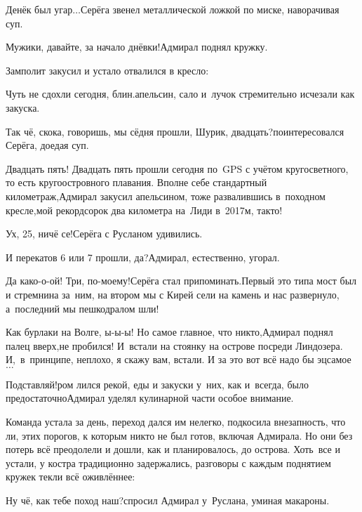 \diagdash Денёк был угар$\ldots$\mdash Серёга звенел металлической ложкой по миске, наворачивая суп.%

\diagdash Мужики, давайте, за начало днёвки!\mdash Адмирал поднял кружку.


Замполит закусил и устало отвалился в кресло:

\diagdash Чуть не сдохли сегодня, блин.\mdash апельсин, сало и~лучок стремительно исчезали как закуска.

\diagdash Так чё, скока, говоришь, мы сёдня прошли, Шурик, двадцать?\mdash поинтересовался Серёга, доедая суп.

\diagdash Двадцать пять! Двадцать пять прошли сегодня по~GPS с учётом кругосветного, то есть кругоостровного плавания. Вполне себе стандартный километраж,\mdash Адмирал закусил апельсином, тоже развалившись в~походном кресле,\mdash мой рекорд\mdash сорок два километра на~Лиди в~2017\sdash м, так\sdash то!

\diagdash Ух, 25, ничё се!\mdash Серёга с Русланом удивились.

\diagdash И перекатов 6 или 7 прошли, да?\mdash Адмирал, естественно, угорал.

\diagdash Да како-о-ой! Три, по-моему!\mdash Серёга стал припоминать.\mdash Первый это типа мост был и стремнина за~ним, на втором мы с Кирей сели на камень и нас развернуло, а~последний мы пешкодралом шли!

\diagdash Как бурлаки на Волге, ы-ы-ы! Но самое главное, что никто,\mdash Адмирал поднял палец вверх,\mdash не пробился! И~встали на стоянку на острове посреди Линдозера. И,~в~принципе, неплохо, я скажу вам, встали. И за это вот всё надо бы эц\sdash самое$\ldots$

\diagdash Подставляй!\mdash ром лился рекой, еды и закуски у~них, как и~всегда, было предостаточно\mdash Адмирал уделял кулинарной части особое внимание.

Команда устала за день, переход дался им нелегко, подкосила внезапность, что ли, этих порогов, к которым никто не был готов, включая Адмирала. Но они без потерь всё преодолели и дошли, как и планировалось, до острова. Хоть~все и устали, у костра традиционно задержались, разговоры с каждым поднятием кружек текли всё оживлённее:

\diagdash Ну чё, как тебе поход наш?\mdash спросил Адмирал у~Руслана, уминая макароны.

